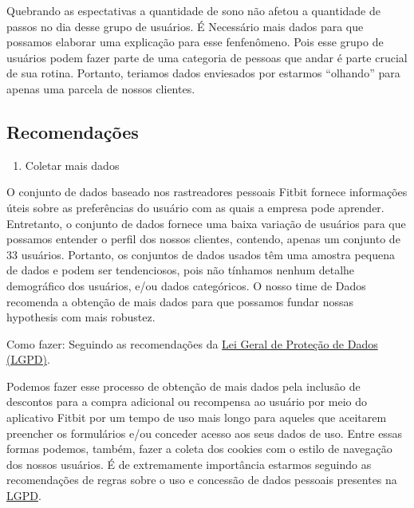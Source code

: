 Quebrando as espectativas a quantidade de sono não afetou a quantidade
de passos no dia desse grupo de usuários. É Necessário mais dados para
que possamos elaborar uma explicação para esse fenfenômeno. Pois esse
grupo de usuários podem fazer parte de uma categoria de pessoas que
andar é parte crucial de sua rotina. Portanto, teriamos dados enviesados
por estarmos ``olhando'' para apenas uma parcela de nossos clientes.

\subsection{Recomendações}

\begin{enumerate}
    \def\labelenumi{\arabic{enumi}.}
    \tightlist
    \item
          Coletar mais dados
\end{enumerate}

O conjunto de dados baseado nos rastreadores pessoais Fitbit fornece
informações úteis sobre as preferências do usuário com as quais a
empresa pode aprender. Entretanto, o conjunto de dados fornece uma baixa
variação de usuários para que possamos entender o perfil dos nossos
clientes, contendo, apenas um conjunto de 33 usuários. Portanto, os
conjuntos de dados usados têm uma amostra pequena de dados e podem ser
tendenciosos, pois não tínhamos nenhum detalhe demográfico dos usuários,
e/ou dados categóricos. O nosso time de Dados recomenda a obtenção de
mais dados para que possamos fundar nossas hypothesis com mais robustez.

Como fazer: Seguindo as recomendações da
\href{https://www.bndes.gov.br/wps/portal/site/home/transparencia/lgpd}{Lei
    Geral de Proteção de Dados (LGPD)}.


Podemos fazer esse processo de obtenção de mais dados pela inclusão de descontos para a compra adicional ou recompensa ao usuário por meio do aplicativo Fitbit por um tempo de uso mais longo para aqueles que aceitarem preencher os formulários e/ou conceder acesso aos seus dados de uso. Entre essas formas podemos, também, fazer a coleta dos cookies com o estilo de navegação dos nossos usuários.
É de extremamente importância estarmos seguindo as recomendações de regras sobre o uso e concessão de dados pessoais presentes na \href{https://www.bndes.gov.br/wps/portal/site/home/transparencia/lgpd}{LGPD}.


